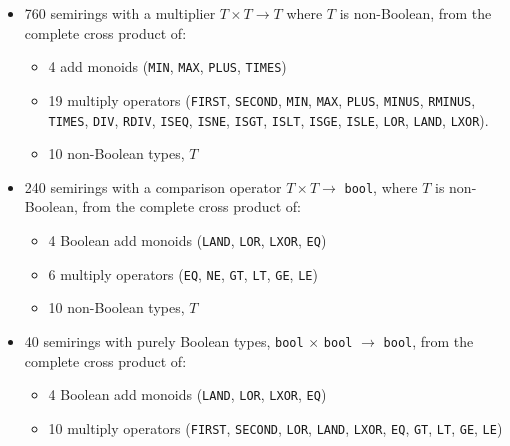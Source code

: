 \documentclass[12pt]{article}
\begin{document}
\vspace{-0.05in}
\begin{itemize}
\item 760 semirings with a multiplier $T \times T \rightarrow T$ where $T$ is
    non-Boolean, from the complete cross product of:

    \vspace{-0.05in}
    \begin{itemize}
    \item 4 add monoids (\verb'MIN', \verb'MAX', \verb'PLUS', \verb'TIMES')
    \item 19 multiply operators
    (\verb'FIRST', \verb'SECOND', \verb'MIN', \verb'MAX',
    \verb'PLUS', \verb'MINUS', \verb'RMINUS', \verb'TIMES', \verb'DIV', \verb'RDIV',
    \verb'ISEQ', \verb'ISNE', \verb'ISGT',
    \verb'ISLT', \verb'ISGE', \verb'ISLE',
    \verb'LOR', \verb'LAND', \verb'LXOR').
    \item 10 non-Boolean types, $T$
    \end{itemize}

\item 240 semirings with a comparison operator $T \times T \rightarrow$
    \verb'bool', where $T$ is non-Boolean, from the complete cross product of:

    \vspace{-0.05in}
    \begin{itemize}
    \item 4 Boolean add monoids
    (\verb'LAND', \verb'LOR', \verb'LXOR', \verb'EQ')
    \item 6 multiply operators
    (\verb'EQ', \verb'NE', \verb'GT', \verb'LT', \verb'GE', \verb'LE')
    \item 10 non-Boolean types, $T$
    \end{itemize}

\item 40 semirings with purely Boolean types, \verb'bool' $\times$ \verb'bool'
    $\rightarrow$ \verb'bool', from the complete cross product of:

    \vspace{-0.05in}
    \begin{itemize}
    \item 4 Boolean add monoids
    (\verb'LAND', \verb'LOR', \verb'LXOR', \verb'EQ')
    \item 10 multiply operators
    (\verb'FIRST', \verb'SECOND', \verb'LOR', \verb'LAND', \verb'LXOR',
    \verb'EQ', \verb'GT', \verb'LT', \verb'GE', \verb'LE')
    \end{itemize}

\end{itemize}
\end{document}

